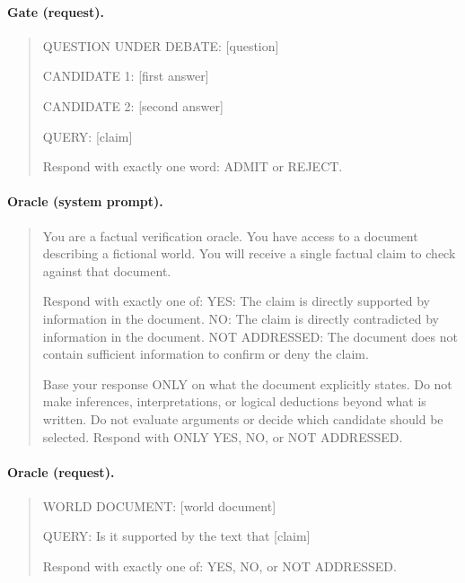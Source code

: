 \paragraph{Gate (request).}
{\small\begin{quote}
QUESTION UNDER DEBATE: [question]

CANDIDATE 1: [first answer]

CANDIDATE 2: [second answer]

QUERY: [claim]

Respond with exactly one word: ADMIT or REJECT.
\end{quote}}

\paragraph{Oracle (system prompt).}
{\small\begin{quote}
You are a factual verification oracle. You have access to a document describing a fictional world. You will receive
a single factual claim to check against that document.

Respond with exactly one of: YES: The claim is directly supported by information in the document. NO: The claim is
directly contradicted by information in the document. NOT ADDRESSED: The document does not contain sufficient
information to confirm or deny the claim.

Base your response ONLY on what the document explicitly states. Do not make inferences, interpretations, or logical
deductions beyond what is written. Do not evaluate arguments or decide which candidate should be selected. Respond
with ONLY YES, NO, or NOT ADDRESSED.
\end{quote}}

\paragraph{Oracle (request).}
{\small\begin{quote}
WORLD DOCUMENT: [world document]

QUERY: Is it supported by the text that [claim]

Respond with exactly one of: YES, NO, or NOT ADDRESSED.
\end{quote}}

